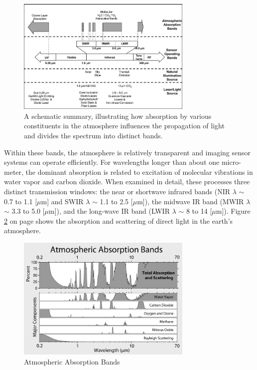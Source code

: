 \begin{figure}[ht!]
\centering
\includegraphics[width=0.75\textwidth]{chapters/img/intro_atmosphere.png}
\caption{A schematic summary, illustrating how absorption by various constituents in the atmosphere influences the propagation of light and divides the spectrum into distinct bands.}
\label{fig:intro_atmosphere}
\end{figure}

Within these bands, the atmosphere is relatively transparent and imaging sensor systems can operate efficiently. For wavelengths longer than about one micro-meter, the dominant absorption is related to excitation of molecular vibrations in water vapor and carbon dioxide. When examined in detail, these processes three distinct transmission windows: the near or shortwave infrared bands (\acs{NIR} $\lambda$ $\sim$ 0.7 to 1.1 [$\mu$m] and \acs{SWIR} $\lambda$ $\sim$ 1.1 to 2.5 [$\mu$m]), the midwave IR band (\acs{MWIR} $\lambda$ $\sim$ 3.3 to 5.0 [$\mu$m]), and the long-wave IR band (\acs{LWIR} $\lambda$ $\sim$ 8 to 14 [$\mu$m]). Figure \ref{fig:intro_atmosphere_bands} on page \pageref{fig:intro_atmosphere_bands} shows the absorption and scattering of direct light in the earth's atmosphere.

\begin{figure}[ht!]
\centering
\includegraphics[width=0.75\textwidth]{chapters/img/intro_atmosphere_bands.png}
\caption{Atmospheric Absorption Bands}
\label{fig:intro_atmosphere_bands}
\end{figure}

